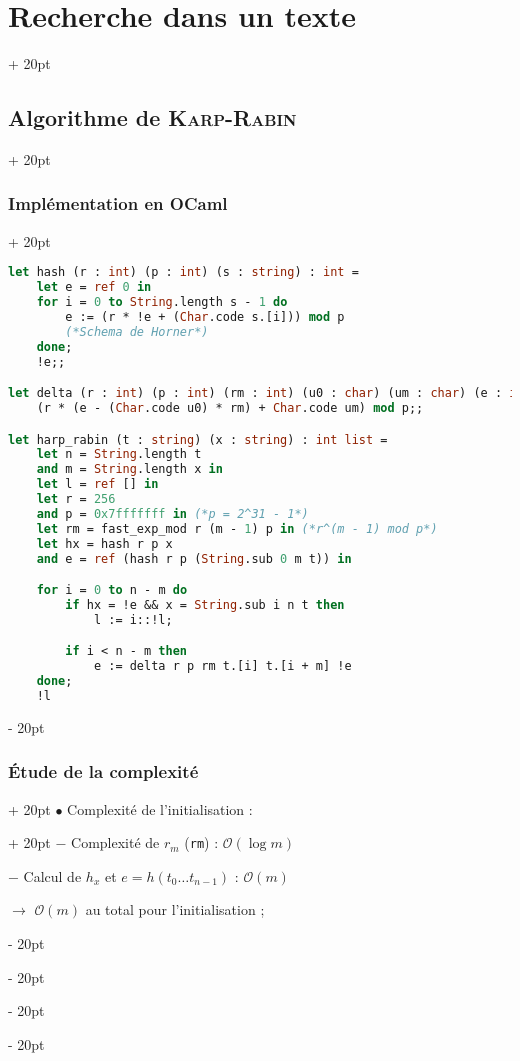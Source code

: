 \documentclass[a4paper, 12pt, twoside]{article}
\newcommand{\ind}[1][20pt]{\advance\leftskip + #1}
\newcommand{\deind}[1][20pt]{\advance\leftskip - #1}
\newenvironment{indt}[2][20pt]{#2 \par \ind[#1]}{\par \deind} %
\begin{document}
\begin{indt}{\section{Recherche dans un texte}}
\begin{indt}{\subsection{Algorithme de \textsc{Karp-Rabin}}}
            \begin{indt}{\subsubsection{Implémentation en OCaml}}
                \begin{lstlisting}[language=Caml, xleftmargin=80pt]
let hash (r : int) (p : int) (s : string) : int =
    let e = ref 0 in
    for i = 0 to String.length s - 1 do
        e := (r * !e + (Char.code s.[i])) mod p
        (*Schema de Horner*)
    done;
    !e;;

let delta (r : int) (p : int) (rm : int) (u0 : char) (um : char) (e : int) : int =
    (r * (e - (Char.code u0) * rm) + Char.code um) mod p;;

let harp_rabin (t : string) (x : string) : int list =
    let n = String.length t
    and m = String.length x in
    let l = ref [] in
    let r = 256
    and p = 0x7fffffff in (*p = 2^31 - 1*)
    let rm = fast_exp_mod r (m - 1) p in (*r^(m - 1) mod p*)
    let hx = hash r p x
    and e = ref (hash r p (String.sub 0 m t)) in

    for i = 0 to n - m do
        if hx = !e && x = String.sub i n t then
            l := i::!l;

        if i < n - m then
            e := delta r p rm t.[i] t.[i + m] !e
    done;
    !l\end{lstlisting}
            \end{indt}

            \vspace{12pt}
            
            \begin{indt}{\subsubsection{\'Etude de la complexité}}
                \begin{indt}{$\bullet$ Complexité de l'initialisation :}
                    $-$ Complexité de $r_m$ (\texttt{rm}) : $\mathcal O(\log m)$

                    $-$ Calcul de $h_x$ et $e = h(t_0 \ldots t_{n - 1})$ : $\mathcal O(m)$

                    \vspace{6pt}
                    
                    $\rightarrow$ $\mathcal O(m)$ au total pour l'initialisation ;
                \end{indt}


\end{indt}
\end{indt}
\end{indt}
\end{document}
